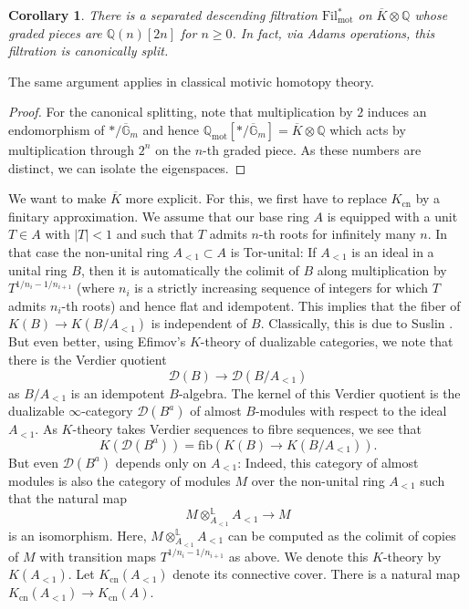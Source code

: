 \documentclass[11pt]{amsart}
\newcommand{\dotimes}{\otimes^{\mathbb L}}
\numberwithin{equation}{section}
\numberwithin{theorem}{section}
\newtheorem{corollary}[theorem]{Corollary}
\theoremstyle{definition}
\begin{document}
\begin{corollary} There is a separated descending filtration $\mathrm{Fil}_{\mathrm{mot}}^\ast$ on $\overline{K}\otimes \mathbb Q$ whose graded pieces are $\mathbb Q(n)[2n]$ for $n\geq 0$. In fact, via Adams operations, this filtration is canonically split.
\end{corollary}

The same argument applies in classical motivic homotopy theory.

\begin{proof} For the canonical splitting, note that multiplication by $2$ induces an endomorphism of $\ast/\overline{\mathbb G}_m$ and hence $\mathbb Q_{\mathrm{mot}}[\ast/\overline{\mathbb G}_m] = \overline{K}\otimes \mathbb Q$ which acts by multiplication through $2^n$ on the $n$-th graded piece. As these numbers are distinct, we can isolate the eigenspaces.
\end{proof}

We want to make $\overline{K}$ more explicit. For this, we first have to replace $K_{\mathrm{cn}}$ by a finitary approximation. We assume that our base ring $A$ is equipped with a unit $T\in A$ with $|T|<1$ and such that $T$ admits $n$-th roots for infinitely many $n$. In that case the non-unital ring $A_{<1}\subset A$ is Tor-unital: If $A_{<1}$ is an ideal in a unital ring $B$, then it is automatically the colimit of $B$ along multiplication by $T^{1/n_i-1/n_{i+1}}$ (where $n_i$ is a strictly increasing sequence of integers for which $T$ admits $n_i$-th roots) and hence flat and idempotent. This implies that the fiber of $K(B)\to K(B/A_{<1})$ is independent of $B$. Classically, this is due to Suslin \cite{SuslinExcision}. But even better, using Efimov's $K$-theory of dualizable categories, we note that there is the Verdier quotient
\[
\mathcal D(B)\to \mathcal D(B/A_{<1})
\]
as $B/A_{<1}$ is an idempotent $B$-algebra. The kernel of this Verdier quotient is the dualizable $\infty$-category $\mathcal D(B^a)$ of almost $B$-modules with respect to the ideal $A_{<1}$. As $K$-theory takes Verdier sequences to fibre sequences, we see that
\[
K(\mathcal D(B^a)) = \mathrm{fib}(K(B)\to K(B/A_{<1})).
\]
But even $\mathcal D(B^a)$ depends only on $A_{<1}$: Indeed, this category of almost modules is also the category of modules $M$ over the non-unital ring $A_{<1}$ such that the natural map
\[
M\dotimes_{A_{<1}} A_{<1}\to M
\]
is an isomorphism. Here, $M\dotimes_{A_{<1}} A_{<1}$ can be computed as the colimit of copies of $M$ with transition maps $T^{1/n_i-1/n_{i+1}}$ as above. We denote this $K$-theory by $K(A_{<1})$. Let $K_{\mathrm{cn}}(A_{<1})$ denote its connective cover. There is a natural map $K_{\mathrm{cn}}(A_{<1})\to K_{\mathrm{cn}}(A)$.
\end{document}
